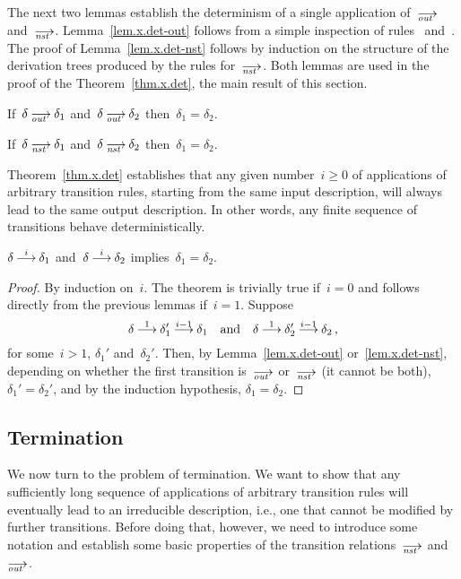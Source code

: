 The next two lemmas establish the determinism of a single application
of~$\out$ and~$\nst$.  Lemma~\ref{lem.x.det-out} follows from a simple
inspection of rules~ and~.  The proof of
Lemma~\ref{lem.x.det-nst} follows by induction on the structure of the
derivation trees produced by the rules for~$\nst$.  Both lemmas are used in
the proof of the Theorem~\ref{thm.x.det}, the main result of this section.

\begin{lemma}[label=lem.x.det-out,restate=lemxdetout]
  If~$\delta\out\delta_1$ and~$\delta\out\delta_2$ then~$\delta_1=\delta_2$.
\end{lemma}

\begin{lemma}[label=lem.x.det-nst,restate=lemxdetnst]
  If~$\delta\nst\delta_1$ and~$\delta\nst\delta_2$ then~$\delta_1=\delta_2$.
\end{lemma}

Theorem~\ref{thm.x.det} establishes that any given number~$i\ge0$ of
applications of arbitrary transition rules, starting from the same input
description, will always lead to the same output description.  In other
words, any finite sequence of transitions behave deterministically.

\begin{theorem}[name=Determinism,label=thm.x.det,restate=thmxdet]
  $\delta\trans[i]\delta_1$ and~$\delta\trans[i]\delta_2$
  implies~$\delta_1=\delta_2$.
\end{theorem}
\begin{proof}
  By induction on~$i$.  The theorem is trivially true if~$i=0$ and follows
  directly from the previous lemmas if~$i=1$.  Suppose
  \[
    \delta\trans[1]\delta_1'\trans[i-1]\delta_1
    \quad\text{and}\quad
    \delta\trans[1]\delta_2'\trans[i-1]\delta_2\,,
  \]
  for some~$i>1$, $\delta_1'$ and~$\delta_2'$.
  Then, by Lemma~\ref{lem.x.det-out} or~\ref{lem.x.det-nst}, depending on
  whether the first transition is~$\out$ or~$\nst$ (it cannot be both),
  $\delta_1'=\delta_2'$, and by the induction hypothesis,
  $\delta_1=\delta_2$.
\end{proof}

\subsection{Termination}
\label{sec.proofs.term}

We now turn to the problem of termination.  We want to show that any
sufficiently long sequence of applications of arbitrary transition rules
will eventually lead to an irreducible description, i.e., one that cannot be
modified by further transitions.  Before doing that, however, we need to
introduce some notation and establish some basic properties of the
transition relations~$\nst$ and~$\out$.

